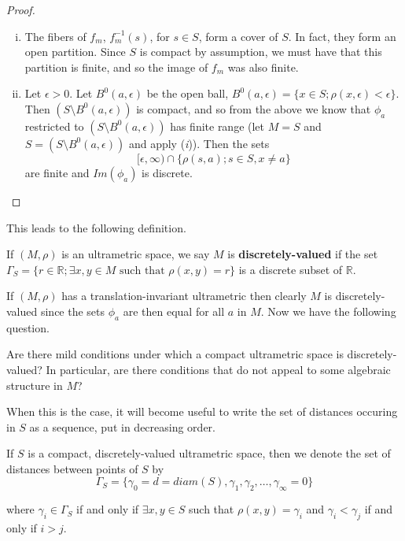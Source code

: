 \begin{proof}
\cite{ar} 
\begin{enumerate}[(i)]
\item The fibers of $f_m$, $f_m^{-1}(s)$, for $s \in S$, form a cover of $S$. In fact, they form an open partition. Since $S$ is compact by assumption, we must have that this partition is finite, and so the image of $f_m$ was also finite.
\item Let $\epsilon >0$. Let $B^0(a,\epsilon)$ be the open ball, $B^0(a,\epsilon)= \{x \in S; \rho(x,\epsilon) < \epsilon\}$. Then $(S\setminus B^0(a,\epsilon))$ is compact, and so from the above we know that $\phi_{a}$ restricted to $(S\setminus B^0(a,\epsilon))$ has finite range (let $M = S$ and $S = (S\setminus B^0(a, \epsilon))$ and apply (\textit{i})). Then the sets \[ [\epsilon, \infty) \cap \{\rho(s,a); s \in S, x \neq a\} \] are finite and $Im(\phi_a)$ is discrete.
\end{enumerate}
\end{proof}

This leads to the following definition.\\

\begin{definition}
If $(M, \rho)$ is an ultrametric space, we say $M$ is \textbf{discretely-valued} if the set $\Gamma_S = \{r \in \mathbb{R}; \exists x,y \in M \text{ such that } \rho(x,y)=r\}$ is a discrete subset of $\mathbb{R}$.
\end{definition}

If $(M,\rho)$ has a translation-invariant ultrametric then clearly $M$ is discretely-valued since the sets $\phi_a$ are then equal for all $a$ in $M$. Now we have the following question.\\

\begin{question}
	Are there mild conditions under which a compact ultrametric space is discretely-valued? In particular, are there conditions that do not appeal to some algebraic structure in $M$?
\end{question}

When this is the case, it will become useful to write the set of distances occuring in $S$ as a sequence, put in decreasing order.\\

\begin{notation*}
	If $S$ is a compact, discretely-valued ultrametric space, then we denote the set of distances between points of $S$ by 
	$$\Gamma_S = \{\gamma_0 = d =diam(S), \gamma_1, \gamma_2, \ldots, \gamma_\infty =0 \}$$
	
	where $\gamma_i \in  \Gamma_S$ if and only if $\exists x,y \in S$ such that $\rho(x,y) = \gamma_i$ and  $\gamma_i < \gamma_j$ if and only if $i > j$. 
\end{notation*}


